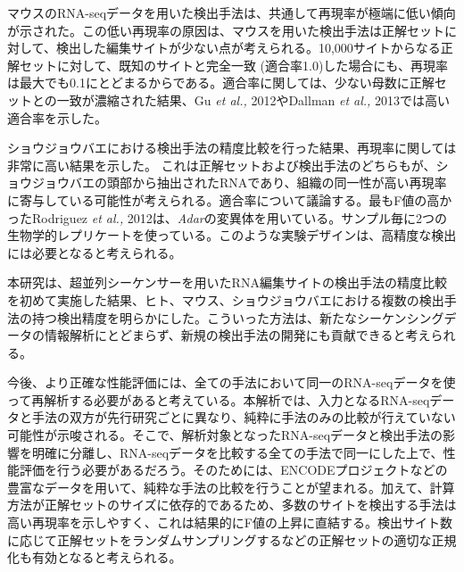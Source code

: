 \par
マウスのRNA-seqデータを用いた検出手法は、共通して再現率が極端に低い傾向が示された。この低い再現率の原因は、マウスを用いた検出手法は正解セットに対して、検出した編集サイトが少ない点が考えられる。10,000サイトからなる正解セットに対して、既知のサイトと完全一致 (適合率1.0)した場合にも、再現率は最大でも0.1にとどまるからである。適合率に関しては、少ない母数に正解セットとの一致が濃縮された結果、Gu \textit{et al., }2012やDallman \textit{et al., }2013では高い適合率を示した。
\par
ショウジョウバエにおける検出手法の精度比較を行った結果、再現率に関しては非常に高い結果を示した。
これは正解セットおよび検出手法のどちらもが、ショウジョウバエの頭部から抽出されたRNAであり、組織の同一性が高い再現率に寄与している可能性が考えられる。適合率について議論する。最もF値の高かったRodriguez \textit{et al., }2012は、\textit{Adar}の変異体を用いている。サンプル毎に2つの生物学的レプリケートを使っている。このような実験デザインは、高精度な検出には必要となると考えられる。
\par
本研究は、超並列シーケンサーを用いたRNA編集サイトの検出手法の精度比較を初めて実施した結果、ヒト、マウス、ショウジョウバエにおける複数の検出手法の持つ検出精度を明らかにした。こういった方法は、新たなシーケンシングデータの情報解析にとどまらず、新規の検出手法の開発にも貢献できると考えられる。
\par
今後、より正確な性能評価には、全ての手法において同一のRNA-seqデータを使って再解析する必要があると考えている。本解析では、入力となるRNA-seqデータと手法の双方が先行研究ごとに異なり、純粋に手法のみの比較が行えていない可能性が示唆される。そこで、解析対象となったRNA-seqデータと検出手法の影響を明確に分離し、RNA-seqデータを比較する全ての手法で同一にした上で、性能評価を行う必要があるだろう。そのためには、ENCODEプロジェクトなどの豊富なデータを用いて、純粋な手法の比較を行うことが望まれる。加えて、計算方法が正解セットのサイズに依存的であるため、多数のサイトを検出する手法は高い再現率を示しやすく、これは結果的にF値の上昇に直結する。検出サイト数に応じて正解セットをランダムサンプリングするなどの正解セットの適切な正規化も有効となると考えられる。


